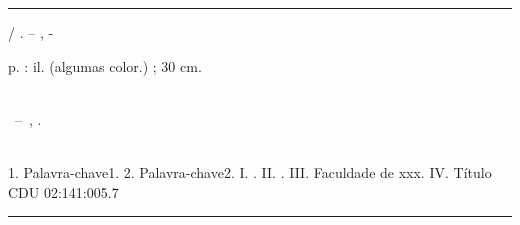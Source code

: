 
\imprimircapa

\imprimirfolhaderosto*


%
%     
\begin{fichacatalografica}\color{blue}
	\vspace*{\fill}					%
	\hrule							%
	\begin{center}					%
	\begin{minipage}[c]{12.5cm}		%
	
	\imprimirautor
	
	\hspace{0.5cm} \imprimirtitulo  / \imprimirautor. --
	\imprimirlocal, \imprimirdata-
	
	\hspace{0.5cm} \pageref{LastPage} p. : il. (algumas color.) ; 30 cm.\\
	
	\hspace{0.5cm} \imprimirorientadorRotulo~\imprimirorientador\\
	
	\hspace{0.5cm}
	\parbox[t]{\textwidth}{\imprimirtipotrabalho~--~\imprimirinstituicao,
	\imprimirdata.}\\
	
	\hspace{0.5cm}
		1. Palavra-chave1.
		2. Palavra-chave2.
		I. \imprimirorientador.
		II. \imprimirinstituicao.
		III. Faculdade de xxx.
		IV. Título\\ 			
	
	\hspace{8.75cm} CDU 02:141:005.7\\
	
	\end{minipage}
	\end{center}
	\hrule
\end{fichacatalografica}

